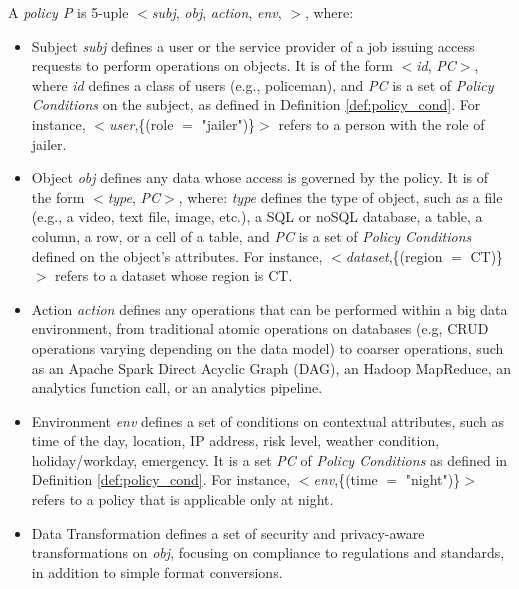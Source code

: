 \begin{definition}[Policy]\label{def:policy_rule}
  A {\it policy P} is 5-uple $<$\textit{subj}, \textit{obj}, \textit{action}, \textit{env}, \textit{\TF}$>$, where:
  \begin{itemize}
    \item Subject \textit{subj} defines a user or the service provider of a job issuing access requests to perform operations on objects.
          It is of the form $<$\emph{id}, \emph{PC}$>$, where \emph{id} defines a class of users (e.g., policeman), and \emph{PC} is a set of \emph{Policy Conditions} on the subject, as defined in Definition \ref{def:policy_cond}.
          For instance, $<$\emph{user},\{(role $=$ "jailer")\}$>$ refers to a person with the role of jailer.

    \item Object \textit{obj} defines any data whose access is governed by the policy.
          It is of the form $<$\emph{type}, \emph{PC}$>$, where: \emph{type} defines the type of object, such as a file (e.g., a video, text file, image, etc.), a SQL or noSQL database, a table, a column, a row, or a cell of a table, and \emph{PC} is a set of \emph{Policy Conditions} defined on the object's attributes.
          For instance, $<$\emph{dataset},\{(region $=$ CT)\}$>$ refers to a dataset whose region is CT.

    \item Action \textit{action} defines any operations that can be performed within a big data environment, from traditional atomic operations on databases (e.g, CRUD operations varying depending on the data model) to coarser operations, such as an Apache Spark Direct Acyclic Graph (DAG), an Hadoop MapReduce, an analytics function call, or an analytics pipeline.

    \item Environment \textit{env} defines a set of conditions on contextual attributes, such as time of the day, location, IP address, risk level, weather condition, holiday/workday, emergency. It is a set \emph{PC} of
          \emph{Policy Conditions} as defined in Definition \ref{def:policy_cond}.
          For instance, $<$\emph{env},\{(time $=$ "night")\}$>$ refers to a policy that is applicable only at night.

    \item Data Transformation \textit{\TF} defines a set of security and privacy-aware transformations on \textit{obj}, focusing on compliance to regulations and standards, in addition to simple format conversions.
  \end{itemize}
\end{definition}

